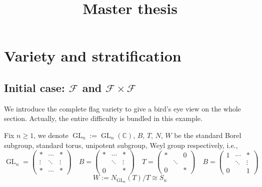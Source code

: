 \documentclass[reqno,11pt]{book}
\numberwithin{equation}{section}
\theoremstyle{plain}
\theoremstyle{plain}
\numberwithin{equation}{section}
\theoremstyle{remark}
\DeclareMathOperator{\GL}{\operatorname{GL}}
\begin{document}
\date{}

\title
{Master thesis
}





\setcounter{tocdepth}{1}
\maketitle
\tableofcontents
\chapter{Variety and stratification}

\section{Initial case: $\mathcal{F}$ and $\mathcal{F} \times \mathcal{F}$}

We introduce the complete flag variety to give a bird's eye view on the whole section. Actually, the entire difficulty is bundled in this example.

Fix $n \geqslant 1$, we denote $\GL_n:=\GL_n(\mathbb{C})$, $B$, $T$, $N$, $W$ be the standard Borel subgroup, standard torus, unipotent subgroup, Weyl group respectively, i.e.,
{
\setlength\arraycolsep{1pt}
\renewcommand{\arraystretch}{0.6}
$$\GL_n= \begin{pmatrix}
* & \cdots & * \\[-1.4mm]
\vdots & \ddots & \vdots \\
* & \cdots & * 
\end{pmatrix} \quad
B= \begin{pmatrix}
* & \cdots & * \\[-1.4mm]
 & \ddots & \vdots \\
\scriptstyle 0 &  & * 
\end{pmatrix} \quad
T= \begin{pmatrix}
* &  & \scriptstyle 0 \\[-1.4mm]
 & \ddots &  \\
\scriptstyle 0 &  & * 
\end{pmatrix} \quad
B= \begin{pmatrix}
\scriptstyle 1 & \cdots & * \\[-1.4mm]
 & \ddots & \vdots \\
\scriptstyle 0 &  & \scriptstyle 1
\end{pmatrix} \quad
$$
$$W:= N_{\GL_n}(T)/T \cong S_n$$
}
\end{document}
